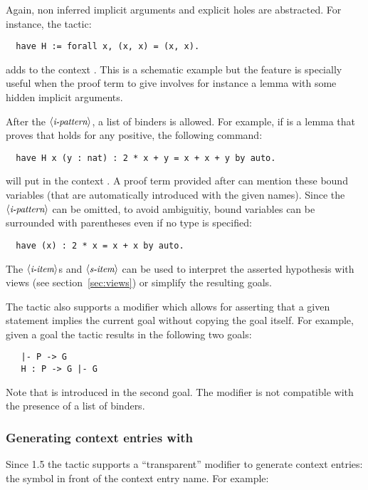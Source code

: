 Again, non inferred implicit arguments and explicit holes are abstracted. For
instance, the tactic:
\begin{lstlisting}
  have H := forall x, (x, x) = (x, x).
\end{lstlisting}
adds to the context . This is a schematic example but
the feature is specially useful when the proof term to give involves
for instance a lemma with some hidden implicit arguments.

After the $\langle\mbox{\itshape\rmfamily\small i-pattern}\rangle$, a list of binders is allowed. 
For example, if  is a lemma that proves that
 holds for any positive, the following command:
\begin{lstlisting}
  have H x (y : nat) : 2 * x + y = x + x + y by auto.
\end{lstlisting}
will put in the context . A proof term
provided after \C{:=} can mention these bound variables (that are
automatically introduced with the given names). 
Since the $\langle\mbox{\itshape\rmfamily\small i-pattern}\rangle$ can be omitted, to avoid ambiguitiy, bound variables
can be surrounded with parentheses even if no type is specified:
\begin{lstlisting}
  have (x) : 2 * x = x + x by auto.
\end{lstlisting}

The $\langle\mbox{\itshape\rmfamily\small i-item}\rangle$s and $\langle\mbox{\itshape\rmfamily\small s-item}\rangle$ can be used to interpret the
asserted hypothesis with views (see section~\ref{sec:views}) or
simplify the resulting goals. 

The  tactic also supports a  modifier which allows for
asserting that a given statement implies the current goal without
copying the goal itself. For example, given a goal  the tactic
 results in the following two goals:
\begin{lstlisting}
   |- P -> G
   H : P -> G |- G
\end{lstlisting}
Note that  is introduced in the second goal. The 
modifier is not compatible with the presence of a list of binders.

\subsubsection*{Generating  context entries with }
\label{sec:havetransparent}

Since \ssr{} 1.5 the  tactic supports a ``transparent'' modifier to
generate  context entries: the  symbol in front of the context
entry name.  For example:

